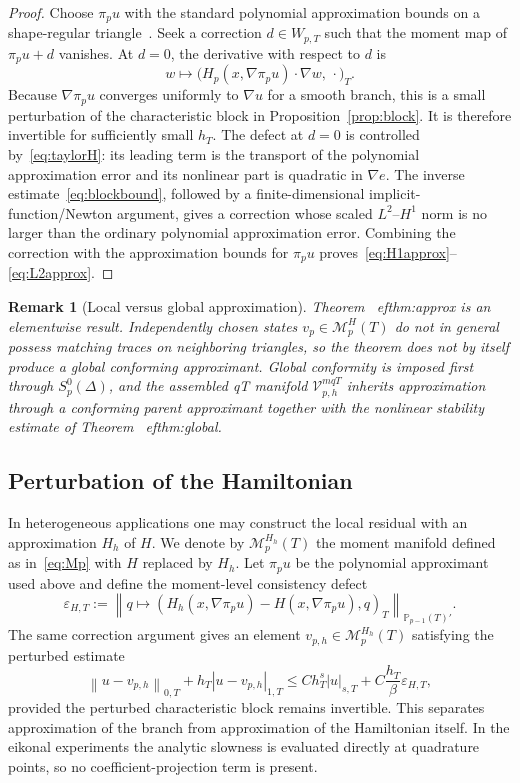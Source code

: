 \documentclass[preprint,12pt]{elsarticle}
\newtheorem{remark}[theorem]{Remark}
\newcommand{\PP}{\mathbb P}
\newcommand{\grad}{\nabla}
\newcommand{\norm}[1]{\left\lVert #1\right\rVert}
\newcommand{\abs}[1]{\left\lvert #1\right\rvert}
\begin{document}
\begin{proof}
Choose $\pi_pu$ with the standard polynomial approximation bounds on a shape-regular triangle~\cite{Ciarlet2002}.  Seek a correction $d\in W_{p,T}$ such that the moment map of $\pi_pu+d$ vanishes.  At $d=0$, the derivative with respect to $d$ is
\[
 w\mapsto \bigl(H_p(x,\grad\pi_pu)\cdot\grad w,\,\cdot\bigr)_T.
\]
Because $\grad\pi_pu$ converges uniformly to $\grad u$ for a smooth branch, this is a small perturbation of the characteristic block in Proposition~\ref{prop:block}.  It is therefore invertible for sufficiently small $h_T$.  The defect at $d=0$ is controlled by~\eqref{eq:taylorH}: its leading term is the transport of the polynomial approximation error and its nonlinear part is quadratic in $\grad e$.  The inverse estimate~\eqref{eq:blockbound}, followed by a finite-dimensional implicit-function/Newton argument, gives a correction whose scaled $L^2$--$H^1$ norm is no larger than the ordinary polynomial approximation error.  Combining the correction with the approximation bounds for $\pi_pu$ proves~\eqref{eq:H1approx}--\eqref{eq:L2approx}.
\end{proof}

\begin{remark}[Local versus global approximation]\label{rem:localglobal}
Theorem~
ef{thm:approx} is an elementwise result.  Independently chosen states $v_p\in\mathcal M_p^H(T)$ do not in general possess matching traces on neighboring triangles, so the theorem does not by itself produce a global conforming approximant.  Global conformity is imposed first through $S_p^0(\Delta)$, and the assembled qT manifold $\mathcal V_{p,h}^{
m qT}$ inherits approximation through a conforming parent approximant together with the nonlinear stability estimate of Theorem~
ef{thm:global}.
\end{remark}

\subsection{Perturbation of the Hamiltonian}
In heterogeneous applications one may construct the local residual with an approximation $H_h$ of $H$.  We denote by $\mathcal M_p^{H_h}(T)$ the moment manifold defined as in~\eqref{eq:Mp} with $H$ replaced by $H_h$.  Let $\pi_pu$ be the polynomial approximant used above and define the moment-level consistency defect
\begin{equation}\label{eq:epsH}
 \varepsilon_{H,T}:=
 \norm{q\mapsto (H_h(x,\grad\pi_pu)-H(x,\grad\pi_pu),q)_T}_{\PP_{p-1}(T)'}.
\end{equation}
The same correction argument gives an element $v_{p,h}\in\mathcal M_p^{H_h}(T)$ satisfying the perturbed estimate
\begin{equation}\label{eq:Hperturb}
 \norm{u-v_{p,h}}_{0,T}+h_T\abs{u-v_{p,h}}_{1,T}
 \le C h_T^s\abs{u}_{s,T}
 +C\frac{h_T}{\beta}\varepsilon_{H,T},
\end{equation}
provided the perturbed characteristic block remains invertible.  This separates approximation of the branch from approximation of the Hamiltonian itself.  In the eikonal experiments the analytic slowness is evaluated directly at quadrature points, so no coefficient-projection term is present.
\end{document}
